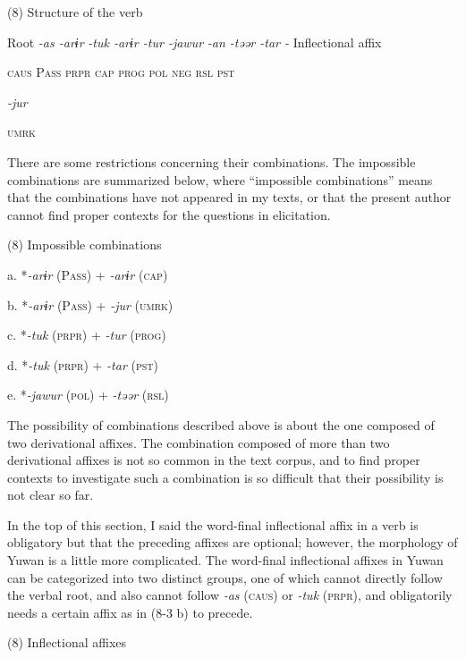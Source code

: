 (8)  Structure of the verb

  Root  \textit{{}-as  {}-arɨr} %
\textit{{}-tuk  {}-arɨr  {}-tur  {}-jawur} %
\textit{{}-an  {}-təər  {}-tar  {}-} Inflectional affix

    \textsc{caus}  P\textsc{ass}  \textsc{prpr}  \textsc{cap}  \textsc{prog}  \textsc{pol}  \textsc{neg}  \textsc{rsl}  \textsc{pst}

          \textit{{}-jur} 

          \textsc{umrk}

There are some restrictions concerning their combinations. The impossible combinations are summarized below, where “impossible combinations” means that the combinations have not appeared in my texts, or that the present author cannot find proper contexts for the questions in elicitation.

(8)  Impossible combinations

  a.  *\textit{{}-arɨr} (P\textsc{ass})   +  \textit{{}-arɨr} (\textsc{cap})

  b.  *\textit{{}-arɨr} (P\textsc{ass})   +  \textit{{}-jur} (\textsc{umrk})

  c.  *\textit{{}-tuk} (\textsc{prpr})  +  \textit{{}-tur} (\textsc{prog})

  d.  *\textit{{}-tuk} (\textsc{prpr})  +  \textit{{}-tar} (\textsc{pst})

  e.  *\textit{{}-jawur} (\textsc{pol})  +  \textit{{}-təər} (\textsc{rsl})

The possibility of combinations described above is about the one composed of two derivational affixes. The combination composed of more than two derivational affixes is not so common in the text corpus, and to find proper contexts to investigate such a combination is so difficult that their possibility is not clear so far.

  In the top of this section, I said the word-final inflectional affix in a verb is obligatory but that the preceding affixes are optional; however, the morphology of Yuwan is a little more complicated. The word-final inflectional affixes in Yuwan can be categorized into two distinct groups, one of which cannot directly follow the verbal root, and also cannot follow \textit{{}-as} (\textsc{caus}) or \textit{{}-tuk} (\textsc{prpr}), and obligatorily needs a certain affix as in (8-3 b) to precede.

(8)  Inflectional affixes

